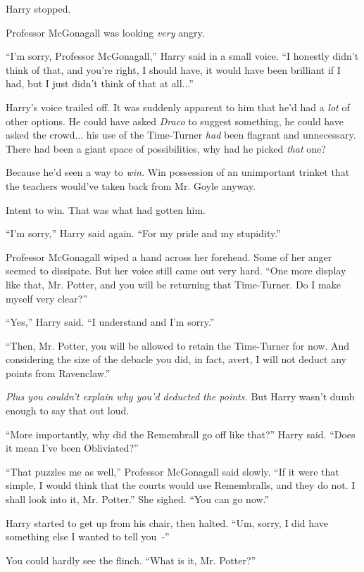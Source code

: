 Harry stopped.

Professor McGonagall was looking \emph{very} angry.

``I'm sorry, Professor McGonagall,'' Harry said in a small voice. ``I honestly didn't think of that, and you're right, I should have, it would have been brilliant if I had, but I just didn't think of that at all...''

Harry's voice trailed off. It was suddenly apparent to him that he'd had a \emph{lot} of other options. He could have asked \emph{Draco} to suggest something, he could have asked the crowd... his use of the Time-Turner \emph{had} been flagrant and unnecessary. There had been a giant space of possibilities, why had he picked \emph{that} one?

Because he'd seen a way to \emph{win.} Win possession of an unimportant trinket that the teachers would've taken back from Mr. Goyle anyway.

Intent to win. That was what had gotten him.

``I'm sorry,'' Harry said again. ``For my pride and my stupidity.''

Professor McGonagall wiped a hand across her forehead. Some of her anger seemed to dissipate. But her voice still came out very hard. ``One more display like that, Mr. Potter, and you will be returning that Time-Turner. Do I make myself very clear?''

``Yes,'' Harry said. ``I understand and I'm sorry.''

``Then, Mr. Potter, you will be allowed to retain the Time-Turner for now. And considering the size of the debacle you did, in fact, avert, I will not deduct any points from Ravenclaw.''

\emph{Plus you couldn't explain why you'd deducted the points.} But Harry wasn't dumb enough to say that out loud.

``More importantly, why did the Remembrall go off like that?'' Harry said. ``Does it mean I've been Obliviated?''

``That puzzles me as well,'' Professor McGonagall said slowly. ``If it were that simple, I would think that the courts would use Remembralls, and they do not. I shall look into it, Mr. Potter.'' She sighed. ``You can go now.''

Harry started to get up from his chair, then halted. ``Um, sorry, I did have something else I wanted to tell you~-''

You could hardly see the flinch. ``What is it, Mr. Potter?''

